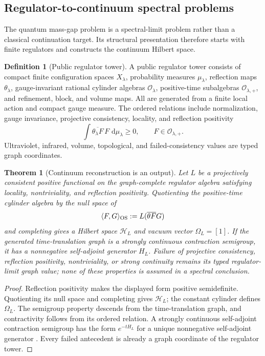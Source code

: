 \documentclass[11pt]{article}
\numberwithin{section}{part}
\theoremstyle{plain}
\newtheorem{theorem}{Theorem}[section]
\theoremstyle{definition}
\newtheorem{definition}[definition]{Definition}
\theoremstyle{remark}
\newcommand{\dd}{\,\mathrm d}
\begin{document}
\subsection{Regulator-to-continuum spectral problems}

The quantum mass-gap problem is a spectral-limit problem rather than a
classical continuation target.  Its structural presentation therefore starts
with finite regulators and constructs the continuum Hilbert space.

\begin{definition}[Public regulator tower]
\label{def:public-regulator-tower}
A public regulator tower consists of compact finite configuration spaces
\(X_\lambda\), probability measures \(\mu_\lambda\), reflection maps
\(\theta_\lambda\), gauge-invariant rational cylinder algebras
\(\mathcal O_\lambda\), positive-time subalgebras
\(\mathcal O_{\lambda,+}\), and refinement, block, and volume maps.  All are
generated from a finite local action and compact gauge measure.  The ordered
relations include normalization, gauge invariance, projective consistency,
locality, and reflection positivity
\begin{equation}
 \label{eq:finite-reflection-positivity}
 \int \overline{\theta_\lambda F}\,F\,\dd\mu_\lambda\ge0,
 \qquad F\in\mathcal O_{\lambda,+}.
\end{equation}
Ultraviolet, infrared, volume, topological, and failed-consistency values are
typed graph coordinates.
\end{definition}

\begin{theorem}[Continuum reconstruction is an output]
\label{thm:continuum-reconstruction-output}
Let \(L\) be a projectively consistent positive functional on the
graph-complete regulator algebra satisfying locality, nontriviality, and
reflection positivity.  Quotienting the positive-time cylinder algebra by
the null space of
\[
 \langle F,G\rangle_{\rm OS}:=L(\overline{\theta F}G)
\]
and completing gives a Hilbert space \(\mathcal H_L\) and vacuum vector
\(\Omega_L=[1]\).  If the generated time-translation graph is a strongly
continuous contraction semigroup, it has a nonnegative self-adjoint
generator \(H_L\).  Failure of projective consistency, reflection positivity,
nontriviality, or strong continuity remains its typed regulator-limit graph
value; none of these properties is assumed in a spectral conclusion.
\end{theorem}

\begin{proof}
Reflection positivity makes the displayed form positive semidefinite.
Quotienting its null space and completing gives \(\mathcal H_L\); the constant
cylinder defines \(\Omega_L\).  The semigroup property descends from the
time-translation graph, and contractivity follows from its ordered relation.
A strongly continuous self-adjoint contraction semigroup has the form
\(e^{-tH_L}\) for a unique nonnegative self-adjoint generator
\citep{OsterwalderSchrader1973,ReedSimonI1980}.  Every failed antecedent is
already a graph coordinate of the regulator tower.
\end{proof}
\end{document}
